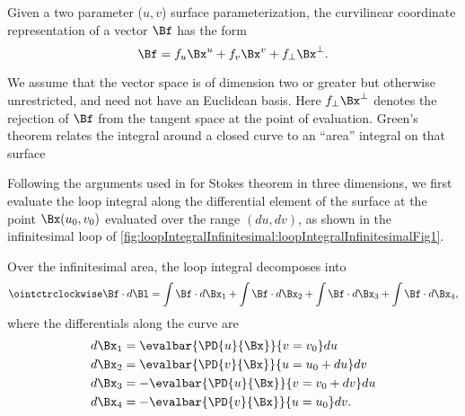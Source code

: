 %
%
Given a two parameter (\(u,v\)) surface parameterization, the curvilinear coordinate representation of a vector \(\Bf\) has the form
\begin{equation}\label{eqn:stokesTheoremGeometricAlgebra:1640}
\Bf = f_u \Bx^u + f_v \Bx^v + f_\perp \Bx^\perp.
\end{equation}

We assume that the vector space is of dimension two or greater but otherwise unrestricted, and need not have an Euclidean basis.  Here \(f_\perp \Bx^\perp\) denotes the rejection of \(\Bf\) from the tangent space at the point of evaluation.  Green's theorem relates the integral around a closed curve to an ``area'' integral on that surface

Following the arguments used in \citep{schwartz1987pe} for Stokes theorem in three dimensions, we first evaluate the loop integral along the differential element of the surface at the point \(\Bx(u_0, v_0)\) evaluated over the range \((du, dv)\), as shown in the infinitesimal loop of \cref{fig:loopIntegralInfinitesimal:loopIntegralInfinitesimalFig1}.

Over the infinitesimal area, the loop integral decomposes into
\begin{equation}\label{eqn:stokesTheoremGeometricAlgebra:1700}
\ointctrclockwise \Bf \cdot d\Bl
=
\int \Bf \cdot d\Bx_1
+\int \Bf \cdot d\Bx_2
+\int \Bf \cdot d\Bx_3
+\int \Bf \cdot d\Bx_4,
\end{equation}
where the differentials along the curve are
\begin{equation}\label{eqn:stokesTheoremGeometricAlgebra:1600}
\begin{aligned}
d\Bx_1 &= \evalbar{ \PD{u}{\Bx} }{v = v_0} du \\
d\Bx_2 &= \evalbar{ \PD{v}{\Bx} }{u = u_0 + du} dv \\
d\Bx_3 &= -\evalbar{ \PD{u}{\Bx} }{v = v_0 + dv} du \\
d\Bx_4 &= -\evalbar{ \PD{v}{\Bx} }{u = u_0} dv.
\end{aligned}
\end{equation}

